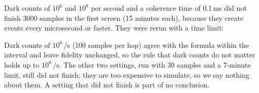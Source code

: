 Dark counts of $10^6$ and $10^8$ per second and a coherence time of $0.1$\,ms did not finish 3000 samples in the first screen (15 minutes each), because they create events every microsecond or faster. They were rerun with a time limit:\par\smallskip
\begin{center}\small\end{center}
Dark counts of $10^6$\,/s (100 samples per hop) agree with the formula within the interval and leave fidelity unchanged, so the rule that dark counts do not matter holds up to $10^6$\,/s. The other two settings, run with 30 samples and a 7-minute limit, still did not finish: they are too expensive to simulate, so we say nothing about them. A setting that did not finish is part of no conclusion.
